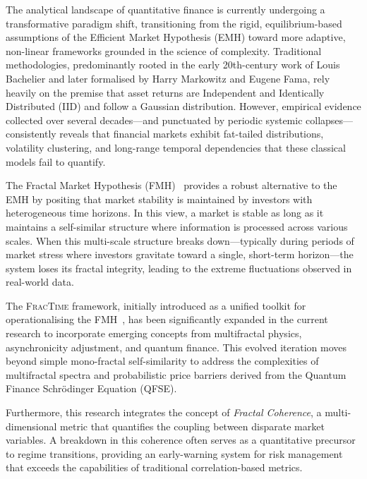 \documentclass[12pt,a4paper]{article}
\begin{document}
The analytical landscape of quantitative finance is currently undergoing a
transformative paradigm shift, transitioning from the rigid, equilibrium-based
assumptions of the Efficient Market Hypothesis (EMH) toward more adaptive,
non-linear frameworks grounded in the science of complexity.  Traditional
methodologies, predominantly rooted in the early 20th-century work of Louis
Bachelier and later formalised by Harry Markowitz and Eugene Fama, rely
heavily on the premise that asset returns are Independent and Identically
Distributed (IID) and follow a Gaussian distribution.  However, empirical
evidence collected over several decades---and punctuated by periodic systemic
collapses---consistently reveals that financial markets exhibit fat-tailed
distributions, volatility clustering, and long-range temporal dependencies
that these classical models fail to quantify.

The Fractal Market Hypothesis (FMH)~\citep{Peters1994} provides a robust
alternative to the EMH by positing that market stability is maintained by
investors with heterogeneous time horizons.  In this view, a market is stable
as long as it maintains a self-similar structure where information is processed
across various scales.  When this multi-scale structure breaks down---typically
during periods of market stress where investors gravitate toward a single,
short-term horizon---the system loses its fractal integrity, leading to the
extreme fluctuations observed in real-world data.

The \textsc{FracTime} framework, initially introduced as a unified toolkit for
operationalising the FMH~\citep{Galbo2026}, has been significantly expanded in
the current research to incorporate emerging concepts from multifractal
physics, asynchronicity adjustment, and quantum finance.  This evolved
iteration moves beyond simple mono-fractal self-similarity to address the
complexities of multifractal spectra and probabilistic price barriers derived
from the Quantum Finance Schr\"{o}dinger Equation (QFSE).

Furthermore, this research integrates the concept of \emph{Fractal Coherence},
a multi-dimensional metric that quantifies the coupling between disparate
market variables.  A breakdown in this coherence often serves as a quantitative
precursor to regime transitions, providing an early-warning system for risk
management that exceeds the capabilities of traditional correlation-based
metrics.

\end{document}
